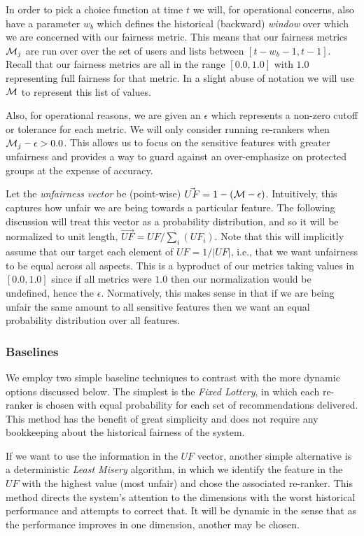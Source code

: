 In order to pick a choice function at time $t$ we will, for operational concerns, also have a parameter $w_b$ which defines the historical (backward) \emph{window} over which we are concerned with our fairness metric.  This means that our fairness metrics $\mathcal{M}_j$ are run over over the set of users and lists between $[t - w_b - 1, t-1]$.  Recall that our fairness metrics are all in the range $[0.0, 1.0]$ with $1.0$ representing full fairness for that metric.  In a slight abuse of notation we will use $\mathcal{M}$ to represent this list of values.

Also, for operational reasons, we are given an $\epsilon$ which represents a non-zero cutoff or tolerance for each metric.  We will only consider running re-rankers when $\mathcal{M}_j - \epsilon > 0.0$. This allows us to focus on the sensitive features with greater unfairness and provides a way to guard against an over-emphasize on protected groups at the expense of accuracy.

Let the \emph{unfairness vector} be (point-wise) $\vec{UF} = 1 - (\mathcal{M} - \epsilon)$.  Intuitively, this captures how unfair we are being towards a particular feature.  The following discussion will treat this vector as a probability distribution, and so it will be normalized to unit length, $\vec{UF} = UF / \sum_i(UF_i)$. Note that this will implicitly assume that our target each element of $UF = 1/|UF|$, i.e., that we want unfairness to be equal across all aspects.  This is a byproduct of our metrics taking values in $[0.0,1.0]$ since if all metrics were $1.0$ then our normalization would be undefined, hence the $\epsilon$.  Normatively, this makes sense in that if we are being unfair the same amount to all sensitive features then we want an equal probability distribution over all features.

\subsubsection{\textbf{Baselines}}\label{sec:static}
\hfill

We employ two simple baseline techniques to contrast with the more dynamic options discussed below. The simplest is the \textit{Fixed Lottery}, in which each re-ranker is chosen with equal probability for each set of recommendations delivered. This method has the benefit of great simplicity and does not require any bookkeeping about the historical fairness of the system. 

If we want to use the information in the $UF$ vector, another simple alternative is a deterministic \textit{Least Misery} algorithm, in which we identify the feature in the $UF$ with the highest value (most unfair) and chose the associated re-ranker. This method directs the system's attention to the dimensions with the worst historical performance and attempts to correct that. It will be dynamic in the sense that as the performance improves in one dimension, another may be chosen. 

